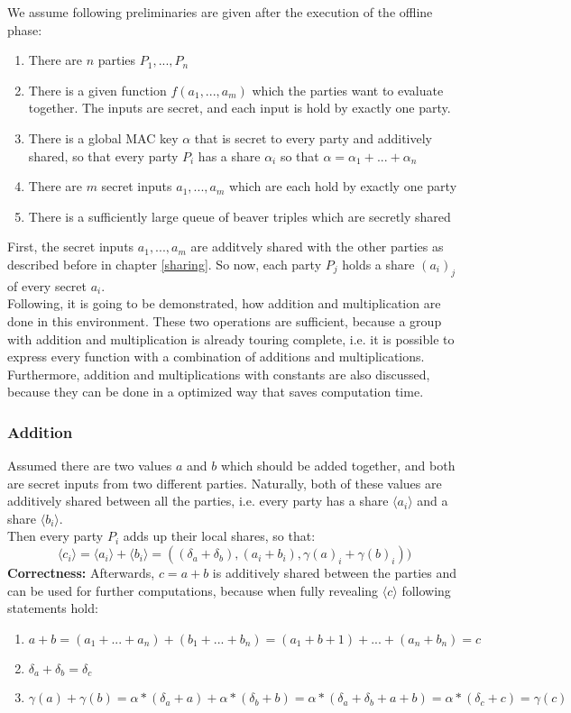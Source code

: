 \documentclass[english,runningheads,a4paper]{llncs}[2018/03/10]
\begin{document}
We assume following preliminaries are given after the execution of the offline phase:\\
\begin{enumerate}
\item There are \(n\) parties \(P_1,...,P_n\)
\item There is a given function \(f(a_1,...,a_m)\) which the parties want to evaluate together. The inputs are secret, and each input is hold by exactly one party.
\item There is a global MAC key \( \alpha\) that is secret to every party and additively shared, so that every party \( P_i\) has a share  \( \alpha_i\) so that  \( \alpha=\alpha_1+...+\alpha_n\)
\item There are $m$ secret inputs $a_1,...,a_m$ which are each hold by exactly one party
\item There is a sufficiently large queue of beaver triples which are secretly shared
\end{enumerate}

First, the secret inputs  $a_1,...,a_m$ are additvely shared with the other parties as described before in chapter \ref{sharing}. So now, each party $P_j$ holds a share ${(a_i)}_j$ of every secret $a_i$.\\

Following, it is going to be demonstrated, how addition and multiplication are done in this environment. These two operations are sufficient, because a group with addition and multiplication is already touring complete, i.e. it is possible to express every function with a combination of additions and multiplications. Furthermore, addition and multiplications with constants are also discussed, because they can be done in a optimized way that saves computation time.

\subsubsection{Addition}
Assumed there are two values \( a\) and \( b\) which should be added together, and both are secret inputs from two different parties. Naturally, both of these values are additively shared between all the parties, i.e. every party has a share \( \langle a_i\rangle\) and a share \( \langle b_i\rangle\).\\

Then every party \( P_i\) adds up their local shares, so that:\\
$$\langle c_i\rangle=\langle a_i\rangle+\langle b_i\rangle=((\delta_a+\delta_b),(a_i+b_i),\gamma (a)_i+\gamma (b)_i))$$
\textbf{Correctness:} Afterwards, \( c=a+b\) is additively shared between the parties and can be used for further computations, because when fully revealing $\langle c\rangle$ following statements hold:
\begin{enumerate}
\item $a+b=(a_1+...+a_n)+(b_1+...+b_n)=(a_1+b+1)+...+(a_n+b_n)=c$
\item $\delta_a+\delta_b=\delta_c$
\item $\gamma(a)+\gamma(b)=\alpha*(\delta_a+a)+\alpha*(\delta_b+b)=\alpha*(\delta_a+\delta_b+a+b)=\alpha*(\delta_c+c)=\gamma(c)$
\end{enumerate}
\end{document}
